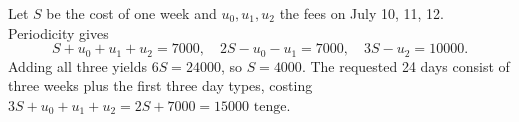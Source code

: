 Let $S$ be the cost of one week and $u_0,u_1,u_2$ the fees on July 10, 11, 12. Periodicity gives
\[S+u_0+u_1+u_2=7000,\quad 2S-u_0-u_1=7000,\quad 3S-u_2=10000.\]
Adding all three yields $6S=24000$, so $S=4000$. The requested 24 days consist of three weeks plus the first three day types, costing $3S+u_0+u_1+u_2=2S+7000=\boxed{15000\text{ tenge}}$.
